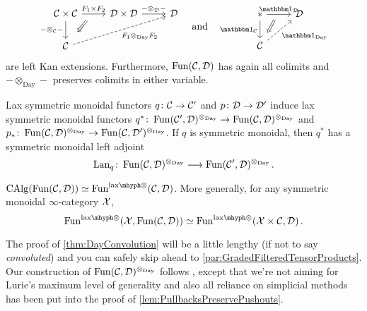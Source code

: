\begin{thm}
\begin{alphanumerate}
\begin{equation*}
			\begin{tikzcd}
				\Cc\times \Cc\rar["F_1\times F_2",""{name=B,sloped}]\arrow[from=B,to=2-1,draw=none,"\Longleftarrow"{sloped,marking,pos=0.5}]\dar["-\otimes_\Cc-"'] & \Dd\times\Dd\rar["-\otimes_\Dd-"] & \Dd\\
				\Cc\ar[urr,dashed,"F_1\otimes_\mathrm{Day}F_2"'] & &
			\end{tikzcd}\quad\text{and}\quad
			\begin{tikzcd}
				*\rar["\IUnit_\Dd",""{name=A,sloped}]\dar["\IUnit_\Cc"']\arrow[from=A,to=2-1,draw=none,"\Longleftarrow"{sloped,marking,pos=0.5}] & \Dd\\
				\Cc\urar[dashed,"\IUnit_{\mathrm{Day}}"']
			\end{tikzcd}
		\end{equation*}
		are left Kan extensions. Furthermore, $\operatorname{Fun}(\mathcal{C},\mathcal{D})$ has again all colimits and $-\otimes_{\mathrm{Day}}-$ preserves colimits in either variable.
		\item Lax symmetric monoidal functors $q\colon \mathcal{C}\rightarrow \mathcal{C}'$ and $p\colon \mathcal{D}\rightarrow \mathcal{D}'$ induce lax symmetric monoidal functors $q^*\colon \operatorname{Fun}(\mathcal{C}',\mathcal{D})^{\otimes_\mathrm{Day}}\rightarrow \operatorname{Fun}(\mathcal{C},\mathcal{D})^{\otimes_{\mathrm{Day}}}$ and $p_*\colon \operatorname{Fun}(\mathcal{C},\mathcal{D})^{\otimes_\mathrm{Day}}\rightarrow \operatorname{Fun}(\mathcal{C},\mathcal{D}')^{\otimes_\mathrm{Day}}$. If $q$ is symmetric monoidal, then $q^*$ has a symmetric monoidal left adjoint
		\begin{equation*}
			\operatorname{Lan}_q\colon \operatorname{Fun}(\mathcal{C},\mathcal{D})^{\otimes_{\mathrm{Day}}}\longrightarrow \operatorname{Fun}(\mathcal{C}',\mathcal{D})^{\otimes_{\mathrm{Day}}}\,.
		\end{equation*}
		\item $\cat{CAlg}(\Fun(\Cc,\Dd))\simeq \Fun^{\lax}(\Cc,\Dd)$. More generally, for any symmetric monoidal $\infty$-category $\mathcal{X}$,
		\begin{equation*}
			\Fun^{\lax}(\Xx,\Fun(\Cc,\Dd))\simeq \Fun^{\lax}(\Xx\times\Cc,\Dd)\,.
		\end{equation*}
	\end{alphanumerate}
\end{thm}
The proof of \cref{thm:DayConvolution} will be a little lengthy (if not to say \emph{convoluted}) and you can safely skip ahead to \cref{par:GradedFilteredTensorProducts}. Our construction of $\operatorname{Fun}(\mathcal{C},\mathcal{D})^{\otimes_\mathrm{Day}}$ follows \cite[Construction~]{HA}, except that we're not aiming for Lurie's maximum level of generality and also all reliance on simplicial methods has been put into the proof of \cref{lem:PullbacksPreservePushouts}.
